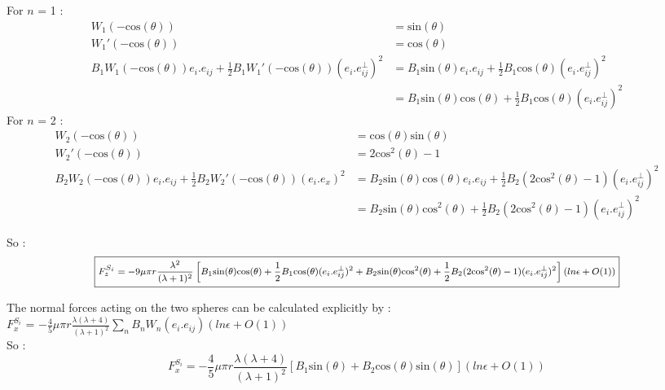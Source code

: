 \documentclass{article}
\begin{document}
For $n$ = 1 : \begin{align*}
    W_1(\mathrm{-cos}(\theta)) &= \mathrm{sin}(\theta) \\
    W_1'(\mathrm{-cos}(\theta)) &= \mathrm{cos}(\theta) \\
    B_1 W_1(\mathrm{-cos}(\theta))e_i.e_{ij}+ \frac{1}{2} B_1  W_1'(\mathrm{-cos}(\theta)) (e_i.e^{\perp}_{ij})^2  &= B_1 \mathrm{sin}(\theta)e_i.e_{ij} + \frac{1}{2} B_1  \mathrm{cos}(\theta) (e_i.e^{\perp}_{ij})^2 \\
    &= B_1 \mathrm{sin}(\theta)\mathrm{cos}(\theta) + \frac{1}{2} B_1  \mathrm{cos}(\theta) (e_i.e^{\perp}_{ij})^2
\end{align*} 
For $n$ = 2 : \begin{align*}
    W_2(\mathrm{-cos}(\theta)) &= \mathrm{cos}(\theta)\mathrm{sin}(\theta) \\
    W_2'(\mathrm{-cos}(\theta)) &= 2\mathrm{cos}^2(\theta) - 1\\
    B_2 W_2(\mathrm{-cos}(\theta))e_i.e_{ij}+ \frac{1}{2} B_2  W_2'(\mathrm{-cos}(\theta)) (e_i.e_x)^2  &= B_2 \mathrm{sin}(\theta)\mathrm{cos}(\theta)e_i.e_{ij} + \frac{1}{2} B_2(2\mathrm{cos}^2(\theta) - 1) (e_i.e^{\perp}_{ij})^2 \\
    &= B_2 \mathrm{sin}(\theta)\mathrm{cos}^2(\theta) + \frac{1}{2} B_2(2\mathrm{cos}^2(\theta) - 1) (e_i.e^{\perp}_{ij})^2
\end{align*}  

So :
\begin{equation*}
\footnotesize
\boxed{
    F_z^{S_i} = -9 \mu \pi r \frac{\lambda ^2}{(\lambda +1)^2} \left[ B_1 \mathrm{sin}(\theta)\mathrm{cos}(\theta) + \frac{1}{2} B_1  \mathrm{cos}(\theta) (e_i.e^{\perp}_{ij})^2 +B_2 \mathrm{sin}(\theta)\mathrm{cos}^2(\theta) + \frac{1}{2} B_2(2\mathrm{cos}^2(\theta) - 1) (e_i.e^{\perp}_{ij})^2\right](ln \epsilon + O(1))}
\end{equation*}
\normalsize
\vspace{0.5cm}

The normal forces acting on the two spheres can be calculated explicitly by : \\
 $F_x^{S_i}$ = $-\frac{4}{5} \mu \pi r \frac{\lambda(\lambda +4)}{(\lambda +1)^2} \sum_{n} B_n W_n(e_i.e_{ij}) (ln \epsilon + O(1))$ \cite{Brumley}
\\ So :
\begin{equation*}
    \boxed{F_x^{S_i} = -\frac{4}{5} \mu \pi r \frac{\lambda(\lambda +4)}{(\lambda +1)^2} \left[ B_1\mathrm{sin}(\theta) +B_2\mathrm{cos}(\theta)\mathrm{sin}(\theta)\right] (ln \epsilon + O(1))}
\end{equation*}
\end{document}
